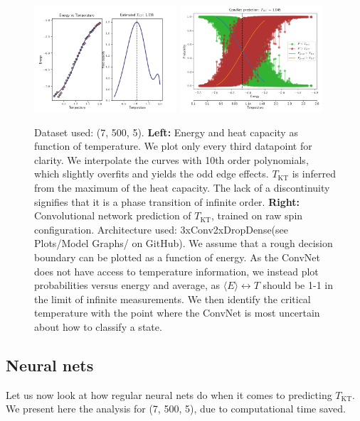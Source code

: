 \documentclass[]{article}
\begin{document}
\begin{figure}
	\hspace{-40px}
	\includegraphics[width=200px]{../Plots/Predictions/MCMC_V0_L7_M500_N5.png}
	\includegraphics[width=200px]{../Plots/Predictions/CNN_V0_L7_M500_N5_2xConvConvPoolDrop.png}
	\caption{Dataset used: (7, 500, 5). \textbf{Left:} Energy and heat capacity as function of temperature. We plot only every third datapoint for clarity. We interpolate the curves with 10th order polynomials, which slightly overfits and yields the odd edge effects. $T_\text{KT}$ is inferred from the maximum of the heat capacity. The lack of a discontinuity signifies that it is a phase transition of infinite order. \textbf{Right:} Convolutional network prediction of $T_\text{KT}$, trained on raw spin configuration. Architecture used: 3xConv2xDropDense(see Plots/Model Graphs/ on GitHub). We assume that a rough decision boundary can be plotted as a function of energy. As the ConvNet does not have access to temperature information, we instead plot probabilities versus energy and average, as $\langle E \rangle \leftrightarrow T$ should be 1-1 in the limit of infinite measurements. We then identify the critical temperature with the point where the ConvNet is most uncertain about how to classify a state.}
	\label{fig:energy_heatcap_example}
\end{figure}

\subsection{Neural nets}
Let us now look at how regular neural nets do when it comes to predicting $T_\text{KT}$. We present here the analysis for (7, 500, 5), due to computational time saved. 
\end{document}
